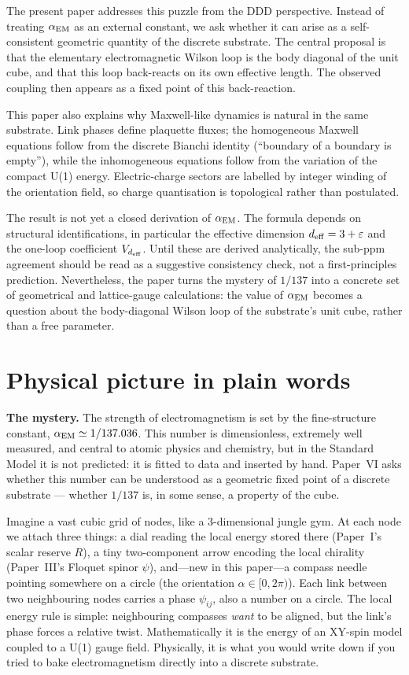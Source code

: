 \documentclass[11pt,a4paper]{article}
\begin{document}
The present paper addresses this puzzle from the DDD
perspective. Instead of treating $\alpha_{\rm EM}$ as an
external constant, we ask whether it can arise as a
self-consistent geometric quantity of the discrete substrate.
The central proposal is that the elementary electromagnetic
Wilson loop is the body diagonal of the unit cube, and that
this loop back-reacts on its own effective length. The observed
coupling then appears as a fixed point of this back-reaction.

This paper also explains why Maxwell-like dynamics is natural in
the same substrate. Link phases define plaquette fluxes; the
homogeneous Maxwell equations follow from the discrete Bianchi
identity (``boundary of a boundary is empty''), while the
inhomogeneous equations follow from the variation of the
compact U(1) energy. Electric-charge sectors are labelled by
integer winding of the orientation field, so charge
quantisation is topological rather than postulated.

The result is not yet a closed derivation of $\alpha_{\rm EM}$.
The formula depends on structural identifications, in
particular the effective dimension $d_{\rm eff} = 3 +
\varepsilon$ and the one-loop coefficient $V_{d_{\rm eff}}$.
Until these are derived analytically, the sub-ppm agreement
should be read as a suggestive consistency check, not a
first-principles prediction. Nevertheless, the paper turns the
mystery of $1/137$ into a concrete set of geometrical and
lattice-gauge calculations: the value of $\alpha_{\rm EM}$
becomes a question about the body-diagonal Wilson loop of the
substrate's unit cube, rather than a free parameter.

\section{Physical picture in plain words}
\label{sec:picture}

\textbf{The mystery.} The strength of electromagnetism is set
by the fine-structure constant, $\alpha_{\rm EM} \simeq
1/137.036$. This number is dimensionless, extremely well
measured, and central to atomic physics and chemistry, but in
the Standard Model it is not predicted: it is fitted to data
and inserted by hand. Paper~VI asks whether this number can be
understood as a geometric fixed point of a discrete substrate
--- whether $1/137$ is, in some sense, a property of the cube.

Imagine a vast cubic grid of nodes, like a 3-dimensional jungle
gym. At each node we attach three things: a dial reading the
local energy stored there (Paper~I's scalar reserve $R$), a tiny
two-component arrow encoding the local chirality (Paper~III's
Floquet spinor $\psi$), and---new in this paper---a compass
needle pointing somewhere on a circle (the orientation
$\alpha \in [0, 2\pi)$). Each link between two neighbouring
nodes carries a phase $\psi_{ij}$, also a number on a circle.
The local energy rule is simple: neighbouring compasses
\emph{want} to be aligned, but the link's phase forces a
relative twist. Mathematically it is the energy of an XY-spin
model coupled to a U(1) gauge field. Physically, it is what you
would write down if you tried to bake electromagnetism directly
into a discrete substrate.
\end{document}
